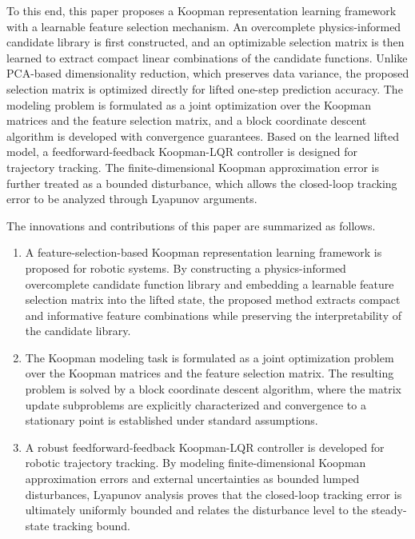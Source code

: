 To this end, this paper proposes a Koopman representation learning framework
with a learnable feature selection mechanism. An overcomplete
physics-informed candidate library is first constructed, and an optimizable
selection matrix is then learned to extract compact linear combinations of the
candidate functions. Unlike PCA-based dimensionality reduction, which preserves
data variance, the proposed selection matrix is optimized directly for lifted
one-step prediction accuracy. The modeling problem is formulated as a joint
optimization over the Koopman matrices and the feature selection matrix, and a
block coordinate descent algorithm is developed with convergence guarantees.
Based on the learned lifted model, a feedforward-feedback Koopman-LQR
controller is designed for trajectory tracking. The finite-dimensional Koopman
approximation error is further treated as a bounded disturbance, which allows
the closed-loop tracking error to be analyzed through Lyapunov arguments.

The innovations and contributions of this paper are summarized as follows.
{\renewcommand{\labelenumi}{(\arabic{enumi})}
\begin{enumerate}
\item A feature-selection-based Koopman representation learning framework is
proposed for robotic systems. By constructing a physics-informed overcomplete
candidate function library and embedding a learnable feature selection matrix
into the lifted state, the proposed method extracts compact and informative
feature combinations while preserving the interpretability of the candidate
library.

\item The Koopman modeling task is formulated as a joint optimization problem
over the Koopman matrices and the feature selection matrix. The resulting
problem is solved by a block coordinate descent algorithm, where the matrix
update subproblems are explicitly characterized and convergence to a
stationary point is established under standard assumptions.

\item A robust feedforward-feedback Koopman-LQR controller is developed for
robotic trajectory tracking. By modeling finite-dimensional Koopman
approximation errors and external uncertainties as bounded lumped
disturbances, Lyapunov analysis proves that the closed-loop tracking error is
ultimately uniformly bounded and relates the disturbance level to the
steady-state tracking bound.
\end{enumerate}}

